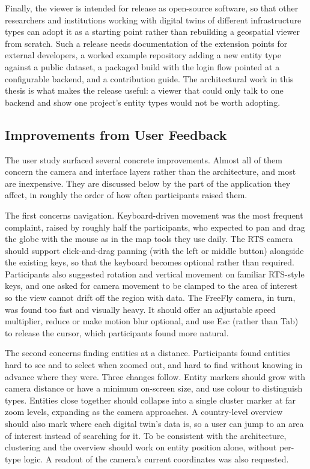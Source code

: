Finally, the viewer is intended for release as open-source software, so that other researchers and institutions working with digital twins of different infrastructure types can adopt it as a starting point rather than rebuilding a geospatial viewer from scratch. Such a release needs documentation of the extension points for external developers, a worked example repository adding a new entity type against a public dataset, a packaged build with the login flow pointed at a configurable backend, and a contribution guide. The architectural work in this thesis is what makes the release useful: a viewer that could only talk to one backend and show one project's entity types would not be worth adopting.

\subsection{Improvements from User Feedback}
\label{sec:conc-future-feedback}

The user study surfaced several concrete improvements. Almost all of them concern the camera and interface layers rather than the architecture, and most are inexpensive. They are discussed below by the part of the application they affect, in roughly the order of how often participants raised them.

The first concerns navigation. Keyboard-driven movement was the most frequent complaint, raised by roughly half the participants, who expected to pan and drag the globe with the mouse as in the map tools they use daily. The RTS camera should support click-and-drag panning (with the left or middle button) alongside the existing keys, so that the keyboard becomes optional rather than required. Participants also suggested rotation and vertical movement on familiar RTS-style keys, and one asked for camera movement to be clamped to the area of interest so the view cannot drift off the region with data. The FreeFly camera, in turn, was found too fast and visually heavy. It should offer an adjustable speed multiplier, reduce or make motion blur optional, and use Esc (rather than Tab) to release the cursor, which participants found more natural.

The second concerns finding entities at a distance. Participants found entities hard to see and to select when zoomed out, and hard to find without knowing in advance where they were. Three changes follow. Entity markers should grow with camera distance or have a minimum on-screen size, and use colour to distinguish types. Entities close together should collapse into a single cluster marker at far zoom levels, expanding as the camera approaches. A country-level overview should also mark where each digital twin's data is, so a user can jump to an area of interest instead of searching for it. To be consistent with the architecture, clustering and the overview should work on entity position alone, without per-type logic. A readout of the camera's current coordinates was also requested.


